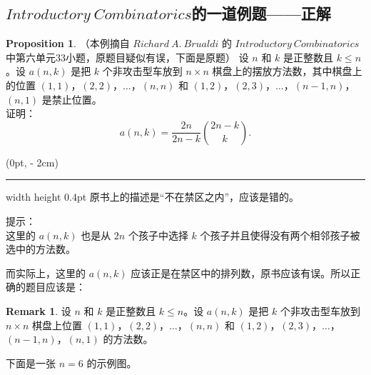 \documentclass[oneside]{book}
\theoremstyle{definition}
\newtheorem{proposition}{Proposition}[section]
\newtheorem{remark}{Remark}[section]
\begin{document}
\subsection{$Introductory\ Combinatorics$的一道例题——正解}
\begin{proposition}
	（本例摘自 $ Richard\ A.\ Brualdi$ 的 $Introductory\ Combinatorics$ 中第六单元33小题，原题目疑似有误，下面是原题）
	设 \( n \) 和 \( k \) 是正整数且 \( k \leq n \)。设 \( a(n, k) \) 是把 \( k \) 个非攻击型车放到 \( n \times n \) 棋盘上的摆放方法数，其中棋盘上的位置 \( (1, 1) \)，\( (2, 2) \)，\( \dots \)，\( (n, n) \) 和 \( (1, 2) \)，\( (2, 3) \)，\( \dots \)，\( (n-1, n) \)，\( (n, 1) \) 是禁止位置。\\
	证明：\\
	 \[ a(n, k) =\frac{2n}{2n-k}\binom{2n-k}{k}.\]
	 \begin{textblock*}{\textwidth}(0pt, \dimexpr\paperheight - 2cm\relax)
	 	\centering  %
	 	\hrule width \textwidth height 0.4pt 
	 	\vspace{5pt} 
	 	\small 原书上的描述是“不在禁区之内”，应该是错的。
	 \end{textblock*}
	提示：\\
	这里的 \( a(n, k) \) 也是从 \( 2n \) 个孩子中选择 \( k \) 个孩子并且使得没有两个相邻孩子被选中的方法数。
	
	而实际上，这里的 \( a(n, k) \) 应该正是在禁区中的排列数，原书应该有误。所以正确的题目应该是：
\end{proposition}
\begin{remark}
	设 \( n \) 和 \( k \) 是正整数且 \( k \leq n \)。设 \( a(n, k) \) 是把 \( k \) 个非攻击型车放到 \( n \times n \) 棋盘上位置 \( (1, 1) \)，\( (2, 2) \)，\( \dots \)，\( (n, n) \) 和 \( (1, 2) \)，\( (2, 3) \)，\( \dots \)，\( (n-1, n) \)，\( (n, 1) \) 的方法数。
\end{remark}
下面是一张 \( n=6\) 的示例图。
\end{document}
